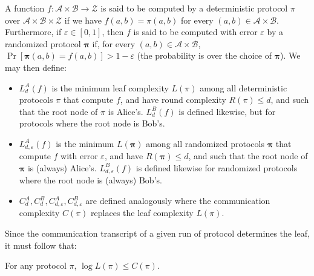 \begin{definition}
A function $f:\mathcal A\times\mathcal B\to\mathcal Z$ is said to be computed by a deterministic protocol $\pi$ over $\mathcal A\times\mathcal B\times\mathcal Z$ if we have $f(a,b)=\pi(a,b)$ for every $(a,b)\in\mathcal A\times\mathcal B$. Furthermore, if $\varepsilon\in[0,1]$, then $f$ is said to be computed with error $\varepsilon$ by a randomized protocol $\boldsymbol\pi$ if, for every $(a,b)\in\mathcal A\times\mathcal B$, $\Pr[\boldsymbol\pi(a,b)=f(a,b)]>1-\varepsilon$ (the probability is over the choice of $\boldsymbol\pi$).
We may then define:
\begin{itemize}
\item $L_d^A(f)$ is the minimum leaf complexity $L(\pi)$ among all deterministic protocols $\pi$ that compute $f$, and have round complexity $R(\pi)\le d$, and such that the root node of $\pi$ is Alice's. $L_d^B(f)$ is defined likewise, but for protocols where the root node is Bob's.
\item $L_{d,\varepsilon}^A(f)$ is the minimum $L(\boldsymbol\pi)$ among all randomized protocols $\boldsymbol\pi$ that compute $f$ with error $\varepsilon$, and have $R(\boldsymbol\pi)\le d$, and such that the root node of $\boldsymbol\pi$ is (always) Alice's. $L_{d,\varepsilon}^B(f)$ is defined likewise for randomized protocols where the root node is (always) Bob's.
\item $C_d^A,C_d^B,C_{d,\varepsilon}^A,C_{d,\varepsilon}^B$ are defined analogously where the communication complexity $C(\pi)$ replaces the leaf complexity $L(\pi)$.
\end{itemize}
\end{definition}
Since the communication transcript of a given run of protocol determines the leaf, it must follow that:
\begin{proposition} For any protocol $\pi$, $\log L(\pi)\le C(\pi)$.\end{proposition}
